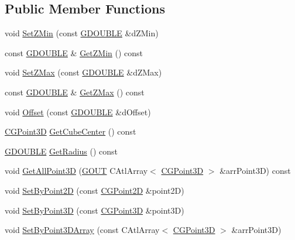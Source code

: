 \subsection*{Public Member Functions}
\begin{DoxyCompactItemize}
\item 
void \hyperlink{class_c_g_cube_af0c519c3dad1d1c22e1807af345ca4ad}{Set\+Z\+Min} (const \hyperlink{_g_types_8h_afd05ac85f90ee8e2a733928545462cd4}{G\+D\+O\+U\+B\+L\+E} \&d\+Z\+Min)
\item 
const \hyperlink{_g_types_8h_afd05ac85f90ee8e2a733928545462cd4}{G\+D\+O\+U\+B\+L\+E} \& \hyperlink{class_c_g_cube_aecba3b09efc5bb043d3f333af9061c07}{Get\+Z\+Min} () const 
\item 
void \hyperlink{class_c_g_cube_af3038bdc51a3c126cbe8de23e7366e0d}{Set\+Z\+Max} (const \hyperlink{_g_types_8h_afd05ac85f90ee8e2a733928545462cd4}{G\+D\+O\+U\+B\+L\+E} \&d\+Z\+Max)
\item 
const \hyperlink{_g_types_8h_afd05ac85f90ee8e2a733928545462cd4}{G\+D\+O\+U\+B\+L\+E} \& \hyperlink{class_c_g_cube_adce282227f7708bfc526fe6fc032d634}{Get\+Z\+Max} () const 
\item 
void \hyperlink{class_c_g_cube_a73cb98ab9e512b331f18014f773f70ae}{Offset} (const \hyperlink{_g_types_8h_afd05ac85f90ee8e2a733928545462cd4}{G\+D\+O\+U\+B\+L\+E} \&d\+Offset)
\item 
\hyperlink{class_c_g_point3_d}{C\+G\+Point3\+D} \hyperlink{class_c_g_cube_a312bdd139c243ccdddd3aa634a06c3cc}{Get\+Cube\+Center} () const 
\item 
\hyperlink{_g_types_8h_afd05ac85f90ee8e2a733928545462cd4}{G\+D\+O\+U\+B\+L\+E} \hyperlink{class_c_g_cube_a785927e5f586fba36cd07bf4ff3c9efd}{Get\+Radius} () const 
\item 
void \hyperlink{class_c_g_cube_ace1b006dc299e091c2db0576324a799e}{Get\+All\+Point3\+D} (\hyperlink{_g_types_8h_a0858ec221262e635612871d70ca233ad}{G\+O\+U\+T} C\+Atl\+Array$<$ \hyperlink{class_c_g_point3_d}{C\+G\+Point3\+D} $>$ \&arr\+Point3\+D) const 
\item 
void \hyperlink{class_c_g_cube_a4685e4db42e661fa39427b2c93e71091}{Set\+By\+Point2\+D} (const \hyperlink{class_c_g_point2_d}{C\+G\+Point2\+D} \&point2\+D)
\item 
void \hyperlink{class_c_g_cube_aaae2ae68b48ba3d25cee64b092cab90d}{Set\+By\+Point3\+D} (const \hyperlink{class_c_g_point3_d}{C\+G\+Point3\+D} \&point3\+D)
\item 
void \hyperlink{class_c_g_cube_aed49366e4972adb53fb905d46ea8682e}{Set\+By\+Point3\+D\+Array} (const C\+Atl\+Array$<$ \hyperlink{class_c_g_point3_d}{C\+G\+Point3\+D} $>$ \&arr\+Point3\+D)

\end{DoxyCompactItemize}
